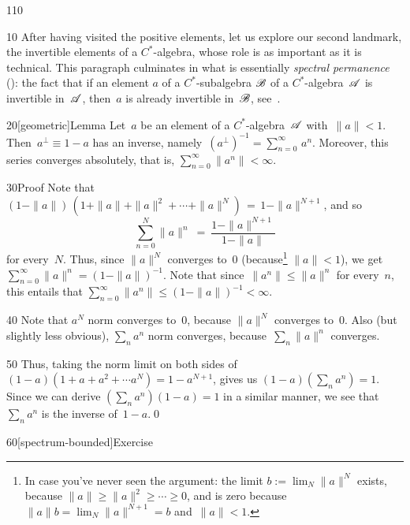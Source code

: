 %
% 
\begin{parsec}{110}%
\begin{point}{10}%
After having visited the positive elements,
let us explore our second landmark,
the  invertible elements
of a $C^*$-algebra,
whose role 
is as important as it is technical.
This paragraph culminates in what is essentially
 \emph{spectral permanence} ():
the fact that if an element $a$ of a $C^*$-subalgebra $\mathscr{B}$
of a $C^*$-algebra~$\mathscr{A}$
is invertible in~$\mathscr{A}$,
then~$a$ is already invertible in~$\mathscr{B}$,
see~.
\end{point}
\begin{point}{20}[geometric]{Lemma}%
%
Let~$a$ be an element of a $C^*$-algebra~$\mathscr{A}$ with~$\|a\|<1$.
Then~$a^\perp\equiv 1-a$ has an inverse,
namely~$(a^\perp)^{-1}= \sum_{n=0}^\infty\, a^n$.
Moreover, this series converges absolutely,
that is,
$\sum_{n=0}^\infty \|a^n\|<\infty$.
\begin{point}{30}{Proof}%
Note that
$(1-\|a\|)\,(1+\|a\|+\|a\|^2+\dotsb+\|a\|^N) \,=\, 1-\|a\|^{N+1}$,
and so 
\begin{equation*}
\sum_{n=0}^N \|a\|^n \ =\  \frac{1-\|a\|^{N+1}}{1-\|a\|}
\end{equation*}
for every~$N$.
Thus,
since $\|a\|^N$ converges to~$0$
(because\footnote{
In case you've never seen the argument:
the limit $b:=\lim_N \|a\|^N$
exists, because $\|a\|\geq \|a\|^2\geq \dotsb\geq 0$,
and is zero
because $\|a\|b=\lim_N \|a\|^{N+1}=b$
and~$\|a\| < 1$.}
 $\|a\|<1$),
we  get $\sum_{n=0}^\infty \|a\|^n = (1-\|a\|)^{-1}$.
Note that since~$\|a^n\|\leq \|a\|^n$ for every~$n$,
    this entails that $\sum_{n=0}^\infty \|a^n\|\leq (1-\|a\|)^{-1}
    <\infty$.
\begin{point}{40}%
Note that $a^N$ norm converges to~$0$,
because $\|a\|^N$ converges to~$0$.
Also (but slightly less obvious),
$\sum_n a^n$ norm converges,
because~$\sum_n \|a\|^n$ converges.
\end{point}
\begin{point}{50}%
Thus, taking the norm limit
on both sides of $(1-a)(1+a+a^2+\dotsb a^N) = 1-a^{N+1}$,
gives us $(1-a)(\sum_n a^n) = 1$.
Since we can derive $(\sum_n a^n)(1-a) = 1$
in a similar manner, 
we see that $\sum_n a^n$ is the inverse of~$1-a$.\qed
\end{point}
\end{point}
\end{point}
\begin{point}{60}[spectrum-bounded]{Exercise}%

\end{point}
\end{parsec}
